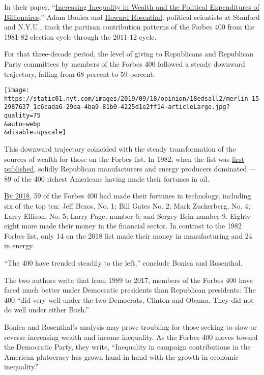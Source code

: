 In their paper,
``\href{https://papers.ssrn.com/sol3/papers.cfm?abstract_id=2668780}{Increasing
Inequality in Wealth and the Political Expenditures of Billionaires},''
Adam Bonica and
\href{http://as.nyu.edu/content/nyu-as/as/faculty/howard-l-rosenthal.html}{Howard
Rosenthal}, political scientists at Stanford and N.Y.U., track the
partisan contribution patterns of the Forbes 400 from the 1981-82
election cycle through the 2011-12 cycle.

For that three-decade period, the level of giving to Republicans and
Republican Party committees by members of the Forbes 400 followed a
steady downward trajectory, falling from 68 percent to 59 percent.

\texttt{[image: https://static01.nyt.com/images/2019/09/18/opinion/18edsall2/merlin\_152987637\_1c6cada6-29ea-4ba9-81b0-4225d1e2ff14-articleLarge.jpg?quality=75\\\&auto=webp\\\&disable=upscale]}

This downward trajectory coincided with the steady transformation of the
sources of wealth for those on the Forbes list. In 1982, when the list
was \href{https://www.verdict.co.uk/forbes-100th-birthday/}{first
published}, solidly Republican manufacturers and energy producers
dominated --- 89 of the 400 richest Americans having made their fortunes
in oil.

\href{https://www.forbes.com/forbes-400/\#1dcfc44d7e2f}{By 2018}, 59 of
the Forbes 400 had made their fortunes in technology, including six of
the top ten: Jeff Bezos, No. 1; Bill Gates No. 2; Mark Zuckerberg, No.
4; Larry Ellison, No. 5; Larry Page, number 6; and Sergey Brin number 9.
Eighty-eight more made their money in the financial sector. In contrast
to the 1982 Forbes list, only 14 on the 2018 list made their money in
manufacturing and 24 in energy.

``The 400 have trended steadily to the left,'' conclude Bonica and
Rosenthal.

The two authors write that from 1989 to 2017, members of the Forbes 400
have fared much better under Democratic presidents than Republican
presidents: The 400 ``did very well under the two Democrats, Clinton and
Obama. They did not do well under either Bush.''

Bonica and Rosenthal's analysis may prove troubling for those seeking to
slow or reverse increasing wealth and income inequality. As the Forbes
400 moves toward the Democratic Party, they write, ``Inequality in
campaign contributions in the American plutocracy has grown hand in hand
with the growth in economic inequality.''

